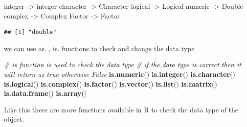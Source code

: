 \documentclass[
]{article}
\newenvironment{Shaded}{\begin{snugshade}}{\end{snugshade}}
\newcommand{\CommentTok}[1]{\textcolor[rgb]{0.56,0.35,0.01}{\textit{#1}}}
\newcommand{\DecValTok}[1]{\textcolor[rgb]{0.00,0.00,0.81}{#1}}
\newcommand{\FunctionTok}[1]{\textcolor[rgb]{0.13,0.29,0.53}{\textbf{#1}}}
\newcommand{\NormalTok}[1]{#1}
\newcommand{\OtherTok}[1]{\textcolor[rgb]{0.56,0.35,0.01}{#1}}
\begin{document}
\begin{Shaded}
\begin{Highlighting}[]
\NormalTok{integer }\OtherTok{{-}\textgreater{}}\NormalTok{ integer}
\NormalTok{character }\OtherTok{{-}\textgreater{}}\NormalTok{ Character}
\NormalTok{logical }\OtherTok{{-}\textgreater{}}\NormalTok{ Logical}
\NormalTok{numeric }\OtherTok{{-}\textgreater{}}\NormalTok{ Double}
\NormalTok{complex }\OtherTok{{-}\textgreater{}}\NormalTok{ Complex}
\NormalTok{Factor }\OtherTok{{-}\textgreater{}}\NormalTok{ Factor}
\end{Highlighting}
\end{Shaded}

\begin{Shaded}
\end{Shaded}

\begin{verbatim}
## [1] "double"
\end{verbatim}

\newpage

we can use as. , is. functions to check and change the data type

\begin{Shaded}
\begin{Highlighting}[]
\CommentTok{\# is function is used to check the data type}
\CommentTok{\# if the data type is correct then it will return as true otherwise False}
\FunctionTok{is.numeric}\NormalTok{()}
\FunctionTok{is.integer}\NormalTok{()}
\FunctionTok{is.character}\NormalTok{()}
\FunctionTok{is.logical}\NormalTok{()}
\FunctionTok{is.complex}\NormalTok{()}
\FunctionTok{is.factor}\NormalTok{()}
\FunctionTok{is.vector}\NormalTok{()}
\FunctionTok{is.list}\NormalTok{()}
\FunctionTok{is.matrix}\NormalTok{()}
\FunctionTok{is.data.frame}\NormalTok{()}
\FunctionTok{is.array}\NormalTok{()}
\end{Highlighting}
\end{Shaded}

Like this there are more functions available in R to check the data type
of the object.
\end{document}
